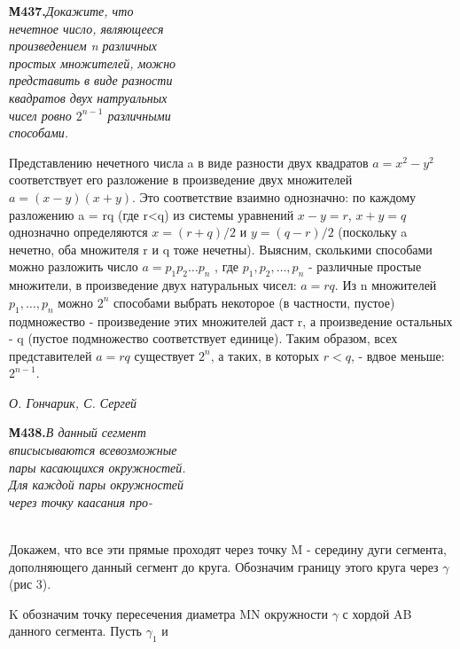 \noindent
\begin{minipage}[t]{0.31\textwidth}
\textbf{М437.}\quad\textit{Докажите, что \\ нечетное число, являющееся \\ произведением n различных \\ простых множителей, можно \\ представить в виде разности \\ квадратов двух натруальных \\ чисел ровно $2^{n-1}$ различными \\ способами.}
\end{minipage}
\hfill
\begin{minipage}[t]{0.67\textwidth}
Представлению нечетного числа a в виде разности двух квадратов $a = x^2 - y^2$ 
соответствует его разложение в произведение двух множителей $a = (x - y)(x + y)$.
Это соответствие взаимно однозначно: по каждому разложению a = rq (где r<q) из системы уравнений $x - y = r$,
$x + y = q$ однозначно определяются $x = (r + q)/2$ и $y = (q - r)/2$ (поскольку a нечетно, 
оба множителя r и q тоже нечетны). Выясним, сколькими способами можно разложить число 
$a = p_1p_2 \dots p_n$ , где $p_1, p_2, \dots, p_n$ - различные простые множители, в произведение двух натуральных 
чисел: $a = rq$. Из n множителей $p_1, \dots, p_n$ можно $2^n$ способами выбрать некоторое (в частности, пустое) подмножество - произведение этих множителей даст r, а произведение остальных - q (пустое подмножество соответствует единице). Таким образом, всех представителей $a = rq$ существует $2^n$, а таких, в которых $r < q$, - вдвое меньше: $2^{n-1}$.
\begin{flushright}
\textit{О. Гончарик, С. Сергей}
\end{flushright}
\end{minipage}

\vspace{0.1cm}
\noindent
\begin{minipage}[t]{0.31\textwidth}
\textbf{М438.}\quad\textit{В данный сегмент \\ вписысываются всевозможные \\ пары касающихся окружностей. \\ Для каждой пары окружностей \\ через точку каасания про-}
\end{minipage}
\hfill
\begin{minipage}[t]{0.67\textwidth}
\makebox[0pt][l]{\raisebox{5ex}{$\blacklozenge$}}\\[-3ex] 
Докажем, что все эти прямые проходят через точку M - середину дуги сегмента, дополняющего данный сегмент до круга. Обозначим границу этого круга через $\gamma$ (рис 3).

 K обозначим точку пересечения диаметра MN окружности $\gamma$ с хордой AB данного сегмента. Пусть $\gamma_1$ и
\end{minipage}

